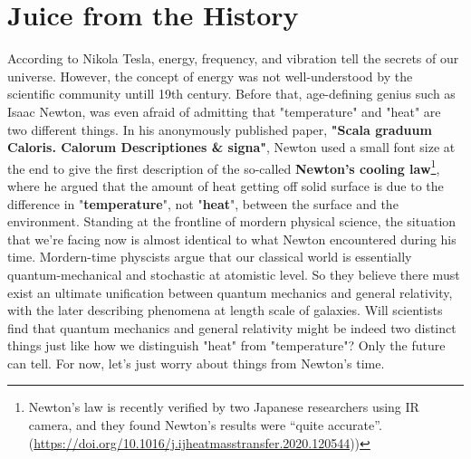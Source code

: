 \section{Juice from the History}
\quad According to Nikola Tesla, energy, frequency, and vibration tell the secrets of our universe. However, the concept of energy was not well-understood by the scientific community untill 19th century. Before that, age-defining genius such as Isaac Newton, was even afraid of admitting that "temperature" and "heat" are two different things. In his anonymously published paper, \textbf{"Scala graduum Caloris. Calorum Descriptiones \& signa"}, Newton used a small font size at the end to give the first description of the so-called \textbf{Newton's cooling law}\footnote{Newton's law is recently verified by two Japanese researchers using IR camera, and they found Newton's results were “quite accurate”.(\url{https://doi.org/10.1016/j.ijheatmasstransfer.2020.120544}))}, where he argued that the amount of heat getting off solid surface is due to the difference in "\textbf{temperature}", not "\textbf{heat}", between the surface and the environment. Standing at the frontline of mordern physical science, the situation that we're facing now is almost identical to what Newton encountered during his time. Mordern-time physcists argue that our classical world is essentially quantum-mechanical and stochastic at atomistic level. So they believe there must exist an ultimate unification between quantum mechanics and general relativity, with the later describing phenomena at length scale of galaxies. Will scientists find that quantum mechanics and general relativity might be indeed two distinct things just like how we distinguish "heat" from "temperature"? Only the future can tell. For now, let's just worry about things from Newton's time.